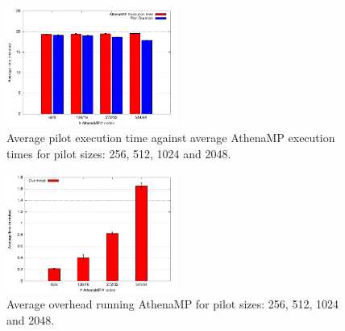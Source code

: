 \begin{figure}[!htb]
        \includegraphics[width=0.5\textwidth]{./figures/NGE/MDET.pdf}
    \caption{Average pilot execution time against average AthenaMP execution times  for pilot sizes: 256, 512, 1024 and 2048.}
\label{fig:strongScala}
\end{figure}
\begin{figure}[!htb]
        \includegraphics[width=0.5\textwidth]{./figures/NGE/MDOver.pdf}
    \caption{Average overhead running AthenaMP for pilot sizes: 256, 512, 1024 and 2048.}
\label{fig:MDScal}
\end{figure}

%
%

